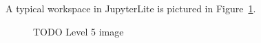         A typical workspace in JupyterLite is pictured in Figure~\ref{fig:ui5}.

        \begin{figure}[htbp]
            \centering
            \caption{TODO Level 5 image}\label{fig:ui5}
        \end{figure}

